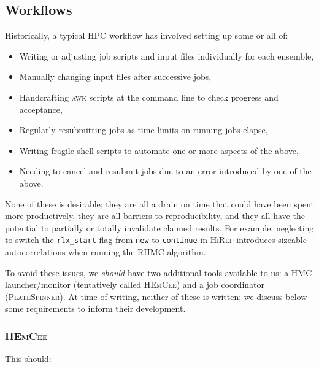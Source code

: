 \documentclass{article}
\newcommand\rfcword[1]{\emph{#1}\xspace}
\newcommand\should{\rfcword{should}}
\newcommand\program[1]{\textsc{#1}\xspace}
\begin{document}
\subsection{Workflows}

Historically,
a typical HPC workflow has involved setting up some or all of:

\begin{itemize}
  \item
        Writing or adjusting job scripts and input files individually for each ensemble,
  \item
        Manually changing input files after successive jobs,
  \item
        Handcrafting \program{awk} scripts at the command line to check progress and acceptance,
  \item
        Regularly resubmitting jobs as time limits on running jobs elapse,
  \item
        Writing fragile shell scripts to automate one or more aspects of the above,
  \item
        Needing to cancel and resubmit jobs due to an error introduced by one of the above.
\end{itemize}

None of these is desirable;
they are all a drain on time that could have been spent more productively,
they are all barriers to reproducibility,
and they all have the potential to partially or totally invalidate claimed results.
For example,
neglecting to switch the \verb|rlx_start| flag from \verb|new| to \verb|continue|
in \program{HiRep}
introduces sizeable autocorrelations when running the RHMC algorithm.

To avoid these issues,
we \should have two additional tools available to us:
a HMC launcher/monitor
(tentatively called \program{HEmCee})
and a job coordinator
(\program{PlateSpinner}).
At time of writing,
neither of these is written;
we discuss below some requirements to inform their development.

\subsubsection{\program{HEmCee}}

This should:
\end{document}
